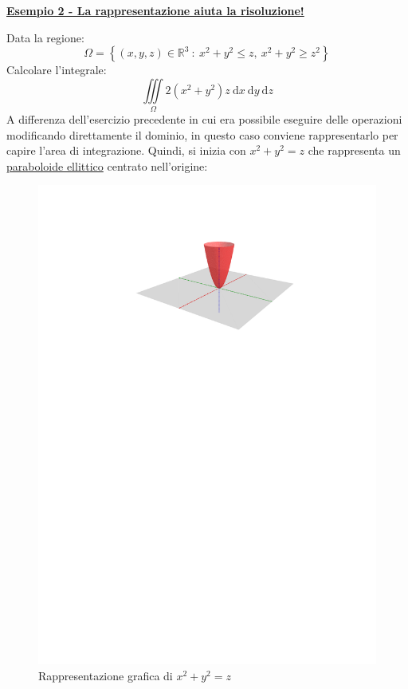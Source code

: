 \documentclass[a4paper]{article}
\newcommand{\example}[1]{\textcolor{Green4}{\textbf{#1}}}
\begin{document}
	\begin{flushleft}
		\example{\underline{Esempio 2 - La rappresentazione aiuta la risoluzione!}}
	\end{flushleft}
	Data la regione:
	\begin{equation*}
		\Omega = \left\{\left(x,y,z\right) \in \mathbb{R}^{3} \: : \: x^{2} + y^{2} \le z, \: x^{2}+y^{2} \ge z^{2}\right\}
	\end{equation*}
	Calcolare l'integrale:
	\begin{equation*}
		\displaystyle\iiint\limits_{\Omega} 2\left(x^{2}+y^{2}\right)z \:\mathrm{d}x\:\mathrm{d}y\:\mathrm{d}z
	\end{equation*}
	A differenza dell'esercizio precedente in cui era possibile eseguire delle operazioni modificando direttamente il dominio, in questo caso conviene rappresentarlo per capire l'area di integrazione. Quindi, si inizia con $x^{2}+y^{2} = z$ che rappresenta un \href{https://it.wikipedia.org/wiki/Paraboloide}{paraboloide ellittico} centrato nell'origine:
	\begin{figure}[!htp]
		\centering
		\includegraphics[width=.7\textwidth]{img/integrazione_per_fili.pdf}
		\caption{Rappresentazione grafica di $x^{2}+y^{2} = z$}
	\end{figure}
\end{document}
